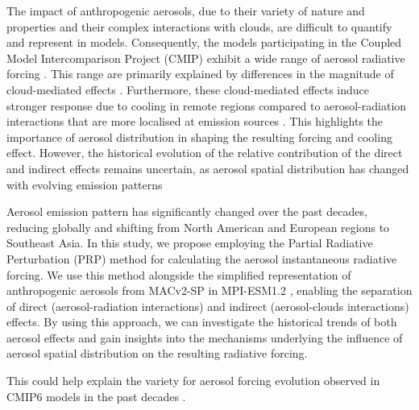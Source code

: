 \documentclass[draft]{agujournal2019}
\begin{document}
      The impact of anthropogenic aerosols, due to their variety of nature and properties and their complex interactions with clouds, are difficult to quantify and represent in models. Consequently, the models participating in the Coupled Model Intercomparison Project (CMIP) exhibit a wide range of aerosol radiative forcing \cite{Bellouin_2020}. This range are primarily explained by differences in the magnitude of cloud-mediated effects \cite{Fiedler_2023}. Furthermore, these cloud-mediated effects induce stronger response due to cooling in remote regions compared to aerosol-radiation interactions that are more localised at emission sources \cite{Huusko_2022}. This highlights the importance of aerosol distribution in shaping the resulting forcing and cooling effect. However, the historical evolution of the relative contribution of the direct and indirect effects remains uncertain, as aerosol spatial distribution has changed with evolving emission patterns \cite{Stevens_2015}
      
      Aerosol emission pattern has significantly changed over the past decades, reducing globally and shifting from North American and European regions to Southeast Asia.
      In this study, we propose employing the Partial Radiative Perturbation (PRP) method \cite{Wetherald_1988,Colman_1997,Klocke_2013} for calculating the aerosol instantaneous radiative forcing. We use this method alongside the simplified representation of anthropogenic aerosols from MACv2-SP \cite{Stevens_2017} in MPI-ESM1.2 \cite{Mauritsen_2019}, enabling the separation of direct (aerosol-radiation interactions) and indirect (aerosol-clouds interactions) effects. By using this approach, we can investigate the historical trends of both aerosol effects and gain insights into the mechanisms underlying the influence of aerosol spatial distribution on the resulting radiative forcing.
    

      This could help explain the variety for aerosol forcing evolution observed in CMIP6 models in the past decades \cite{Fiedler_2023}.                  
\end{document}
